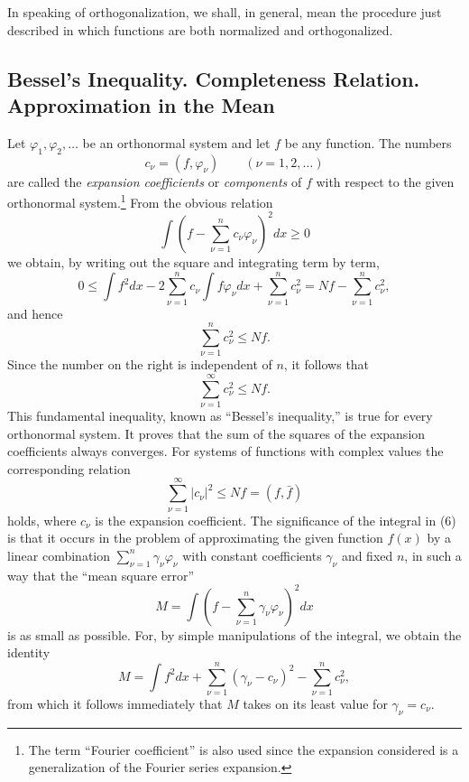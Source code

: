 In speaking of orthogonalization, we shall, in general, mean the procedure just described in which functions are both normalized and orthogonalized.

\subsection{Bessel's Inequality. Completeness Relation. Approximation in the Mean}
Let $\varphi_1,\varphi_2,\ldots$ be an orthonormal system and let $f$ be any function. The numbers
\begin{equation}c_\nu=(f,\varphi_\nu)\qquad(\nu=1,2,\ldots)\tag{5}\end{equation}
are called the \emph{expansion coefficients} or \emph{components} of $f$ with respect to the given orthonormal system.\footnote{The term ``Fourier coefficient'' is also used since the expansion considered is a generalization of the Fourier series expansion.}
From the obvious relation
\begin{equation}\int\left(f-\sum_{\nu=1}^n c_\nu\varphi_\nu\right)^2dx\ge0\tag{6}\end{equation}
we obtain, by writing out the square and integrating term by term,
\[0\le\int f^2dx-2\sum_{\nu=1}^n c_\nu\int f\varphi_\nu dx+\sum_{\nu=1}^n c_\nu^2=Nf-\sum_{\nu=1}^n c_\nu^2,\]
and hence
\begin{equation}\sum_{\nu=1}^n c_\nu^2\le Nf.\tag{7}\end{equation}
Since the number on the right is independent of $n$, it follows that
\begin{equation}\sum_{\nu=1}^{\infty}c_\nu^2\le Nf.\tag{8}\end{equation}
This fundamental inequality, known as ``Bessel's inequality,'' is true for every orthonormal system. It proves that the sum of the squares of the expansion coefficients always converges.
For systems of functions with complex values the corresponding relation
\begin{equation}\sum_{\nu=1}^{\infty}|c_\nu|^2\le Nf=(f,\bar f)\tag{8'}\end{equation}
holds, where $c_\nu$ is the expansion coefficient. The significance of the integral in (6) is that it occurs in the problem of approximating the given function $f(x)$ by a linear combination $\sum_{\nu=1}^n\gamma_\nu\varphi_\nu$ with constant coefficients $\gamma_\nu$ and fixed $n$, in such a way that the ``mean square error''
\[M=\int\left(f-\sum_{\nu=1}^n\gamma_\nu\varphi_\nu\right)^2dx\]
is as small as possible. For, by simple manipulations of the integral, we obtain the identity
\[M=\int f^2dx+\sum_{\nu=1}^n(\gamma_\nu-c_\nu)^2-\sum_{\nu=1}^n c_\nu^2,\]
from which it follows immediately that $M$ takes on its least value for $\gamma_\nu=c_\nu$.

